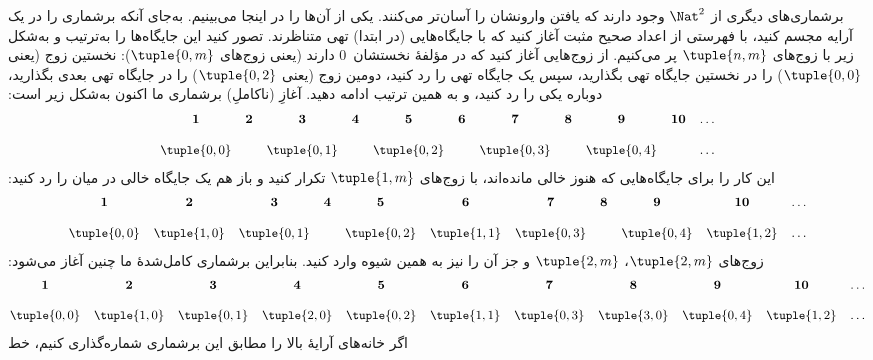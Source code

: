  {
  برشماری‌های دیگری از $\Nat^2$ وجود دارند که یافتن وارونشان را آسان‌تر
  می‌کنند. یکی از آن‌ها را در اینجا می‌بینیم. به‌جای آنکه برشماری را در
  یک آرایه مجسم کنید، با فهرستی از اعداد صحیح مثبت آغاز کنید که با
  جایگاه‌هایی (در ابتدا) تهی متناظرند. تصور کنید این جایگاه‌ها را به‌ترتیب
  و به‌شکل زیر با زوج‌های $\tuple{n,m}$ پر می‌کنیم. از زوج‌هایی آغاز کنید
  که در مؤلفهٔ نخستشان~$0$ دارند (یعنی زوج‌های $\tuple{0,m}$): نخستین زوج
  (یعنی $\tuple{0,0}$) را در نخستین جایگاه تهی بگذارید، سپس یک جایگاه تهی
  را رد کنید، دومین زوج (یعنی $\tuple{0,2}$) را در جایگاه تهی بعدی بگذارید،
  دوباره یکی را رد کنید، و به همین ترتیب ادامه دهید. آغازِ (ناکاملِ)
  برشماری ما اکنون به‌شکل زیر است:
  \[\small
  \begin{array}{@{}c c c c c c c c c c c@{}}
  \mathbf 1 & \mathbf 2 & \mathbf 3 & \mathbf 4 & \mathbf 5 & \mathbf 6 & \mathbf 7 & \mathbf 8 & \mathbf 9 & \mathbf{10} & \dots \\ \\
  \tuple{0,0} &  & \tuple{0,1} &  & \tuple{0,2} &  & \tuple{0,3} & & \tuple{0,4} &  & \dots \\
  \end{array}
  \]
  این کار را برای جایگاه‌هایی که هنوز خالی مانده‌اند، با زوج‌های
  $\tuple{1,m}$ تکرار کنید و باز هم یک جایگاه خالی در میان را رد کنید:
  \[\small
  \begin{array}{@{}c c c c c c c c c c c@{}}
  \mathbf 1 & \mathbf 2 & \mathbf 3 & \mathbf 4 & \mathbf 5 & \mathbf 6 & \mathbf 7 & \mathbf 8 & \mathbf 9 & \mathbf{10} & \dots \\ \\
  \tuple{0,0} & \tuple{1,0} & \tuple{0,1} &  & \tuple{0,2} & \tuple{1,1} &
  \tuple{0,3} & & \tuple{0,4} &  \tuple{1,2} & \dots \\
  \end{array}
  \]
  زوج‌های $\tuple{2,m}$، $\tuple{2,m}$ و جز آن را نیز به همین شیوه وارد
  کنید. بنابراین برشماری کامل‌شدهٔ ما چنین آغاز می‌شود:
  \[\small
  \begin{array}{@{}cc c c c c c c c c c@{}}
  \mathbf 1 & \mathbf 2 & \mathbf 3 & \mathbf 4 & \mathbf 5 & \mathbf 6 & \mathbf 7 & \mathbf 8 & \mathbf 9 & \mathbf{10} & \dots \\ \\
  \tuple{0,0} & \tuple{1,0} & \tuple{0,1} & \tuple{2,0}  & \tuple{0,2} &
  \tuple{1,1} & \tuple{0,3} & \tuple{3,0}  & \tuple{0,4} &  \tuple{1,2} & \dots \\
  \end{array}
  \]
  اگر خانه‌های آرایهٔ بالا را مطابق این برشماری شماره‌گذاری کنیم، خط
}
